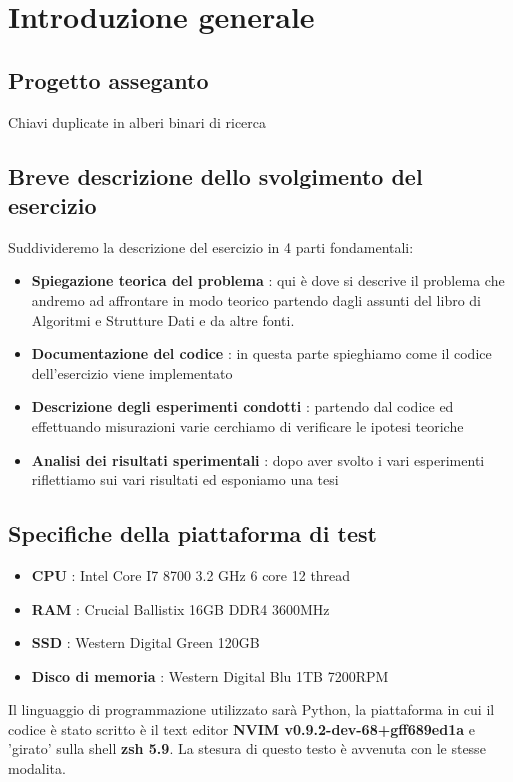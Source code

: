 \section{Introduzione generale}

\subsection{Progetto asseganto}

Chiavi duplicate in alberi binari di ricerca

\subsection{Breve descrizione dello svolgimento del esercizio}
Suddivideremo la descrizione del esercizio in 4 parti fondamentali:

\begin{itemize}
    \item \textbf{Spiegazione teorica del problema} : qui è dove si descrive il problema che andremo ad affrontare in modo teorico partendo dagli assunti del libro di Algoritmi e Strutture Dati e da altre fonti.
    \item \textbf{Documentazione del codice} : in questa parte spieghiamo come il codice dell'esercizio viene implementato 
    \item \textbf{Descrizione degli esperimenti condotti} : partendo dal codice ed effettuando misurazioni varie cerchiamo di verificare le ipotesi teoriche
    \item \textbf{Analisi dei risultati sperimentali} : dopo aver svolto i vari esperimenti riflettiamo sui vari risultati ed esponiamo una tesi
\end{itemize}

\subsection{Specifiche della piattaforma di test}

\begin{itemize}
    \item \textbf{CPU} : Intel Core I7 8700 3.2 GHz 6 core 12 thread
    \item \textbf{RAM} : Crucial Ballistix 16GB DDR4 3600MHz
    \item \textbf{SSD} : Western Digital Green 120GB 
    \item \textbf{Disco di memoria}  : Western Digital Blu 1TB 7200RPM
\end{itemize}

Il linguaggio di programmazione utilizzato sarà Python, la piattaforma in cui il codice è stato scritto è il text editor \textbf{NVIM v0.9.2-dev-68+gff689ed1a} e 'girato' sulla shell \textbf{zsh 5.9}. La stesura di questo testo è avvenuta con le stesse modalita.
